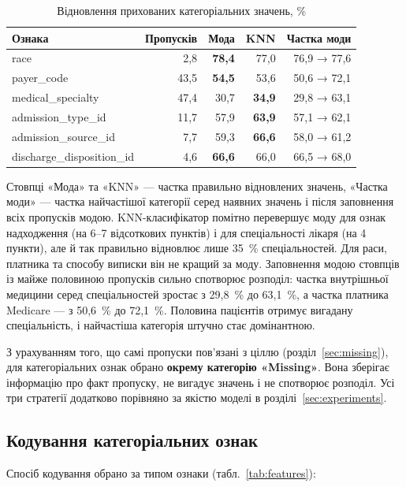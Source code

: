 \documentclass[14pt,a4paper]{extreport}
\begin{document}
\begin{table}[H]
\caption{Відновлення прихованих категоріальних значень, \%}
\label{tab:imp_cat}
\begin{tabularx}{\linewidth}{|X|r|r|r|r|}
\hline
\textbf{Ознака} & \textbf{Пропусків} & \textbf{Мода} & \textbf{KNN} & \textbf{Частка моди} \\
\hline
race & 2,8 & \textbf{78,4} & 77,0 & 76,9 → 77,6 \\
\hline
payer\_code & 43,5 & \textbf{54,5} & 53,6 & 50,6 → 72,1 \\
\hline
medical\_specialty & 47,4 & 30,7 & \textbf{34,9} & 29,8 → 63,1 \\
\hline
admission\_type\_id & 11,7 & 57,9 & \textbf{63,9} & 57,1 → 62,1 \\
\hline
admission\_source\_id & 7,7 & 59,3 & \textbf{66,6} & 58,0 → 61,2 \\
\hline
discharge\_disposition\_id & 4,6 & \textbf{66,6} & 66,0 & 66,5 → 68,0 \\
\hline
\end{tabularx}
\end{table}

Стовпці «Мода» та «KNN» --- частка правильно відновлених значень, «Частка моди» --- частка найчастішої категорії серед наявних значень і після заповнення всіх пропусків модою. KNN-класифікатор помітно перевершує моду для ознак надходження (на 6--7 відсоткових пунктів) і для спеціальності лікаря (на 4 пункти), але й так правильно відновлює лише 35~\% спеціальностей. Для раси, платника та способу виписки він не кращий за моду. Заповнення модою стовпців із майже половиною пропусків сильно спотворює розподіл: частка внутрішньої медицини серед спеціальностей зростає з 29,8~\% до 63,1~\%, а частка платника Medicare --- з 50,6~\% до 72,1~\%. Половина пацієнтів отримує вигадану спеціальність, і найчастіша категорія штучно стає домінантною.

З урахуванням того, що самі пропуски пов'язані з ціллю (розділ~\ref{sec:missing}), для категоріальних ознак обрано \textbf{окрему категорію «Missing»}. Вона зберігає інформацію про факт пропуску, не вигадує значень і не спотворює розподіл. Усі три стратегії додатково порівняно за якістю моделі в розділі~\ref{sec:experiments}.

\subsection{Кодування категоріальних ознак}
\label{sec:encoding}

Спосіб кодування обрано за типом ознаки (табл.~\ref{tab:features}):
\end{document}
